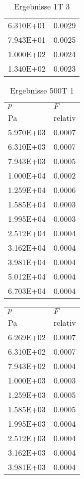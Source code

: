\begin{table}
\begin{tabular}{l l }
\num{6.310E+01}&\num{0.0029}\\
\num{7.943E+01}&\num{0.0025}\\
\num{1.000E+02}&\num{0.0024}\\
\num{1.340E+02}&\num{0.0023}\\
\bottomrule
\end{tabular}\caption{Ergebnisse 1T 3}\end{table}\begin{table}\begin{tabular}{l l }
\toprule
$p$&$F$\\
 Pa & relativ \\\midrule
\num{5.970E+03}&\num{0.0007}\\
\num{6.310E+03}&\num{0.0007}\\
\num{7.943E+03}&\num{0.0005}\\
\num{1.000E+04}&\num{0.0002}\\
\num{1.259E+04}&\num{0.0006}\\
\num{1.585E+04}&\num{0.0003}\\
\num{1.995E+04}&\num{0.0003}\\
\num{2.512E+04}&\num{0.0004}\\
\num{3.162E+04}&\num{0.0004}\\
\num{3.981E+04}&\num{0.0004}\\
\num{5.012E+04}&\num{0.0004}\\
\num{6.703E+04}&\num{0.0004}\\
\bottomrule
\end{tabular}\caption{Ergebnisse 500T 1}\end{table}\begin{table}\begin{tabular}{l l }
\toprule
$p$&$F$\\
 Pa & relativ \\\midrule
\num{6.269E+02}&\num{0.0007}\\
\num{6.310E+02}&\num{0.0007}\\
\num{7.943E+02}&\num{0.0004}\\
\num{1.000E+03}&\num{0.0003}\\
\num{1.259E+03}&\num{0.0005}\\
\num{1.585E+03}&\num{0.0005}\\
\num{1.995E+03}&\num{0.0004}\\
\num{2.512E+03}&\num{0.0004}\\
\num{3.162E+03}&\num{0.0004}\\
\num{3.981E+03}&\num{0.0004}\\

\end{tabular}
\end{table}
